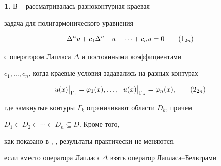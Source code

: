  


\date{} 




 


\pagestyle{plain} %


 


 




 


\maketitle 


\label{begin} 


 


{\bf 1.} В \cite{1}--\cite{3} рассматривалась разноконтурная краевая 


задача для полигармонического уравнения 


\begin{equation} 


\Delta^n u+c_1\Delta^{n-1} u+\dotsb+c_n u=0 


\tag{1${}_{2n}$} 


\end{equation} 


с оператором Лапласа $\Delta$ и постоянными коэффициентами 


$c_1,\dotsc,c_n$, когда краевые условия задавались на разных контурах 


\begin{equation} 


u(x)\big|_{\Gamma_1}=\varphi_1(x),\dotsc,\ \; 


u(x)\big|_{\Gamma_n}=\varphi_n(x), \tag{2${}_{2n}$} 


\end{equation} 


где замкнутые контуры $\Gamma_k$ ограничивают области $D_k$, причем 


$D_1\subset D_2\subset\dotsb\subset D_n\subseteq D$. Кроме того, 


как показано в \cite{2}, \cite{3}, результаты практически не меняются, 


если вместо оператора Лапласа $\Delta$ взять оператор Лапласа--Бельтрами 


